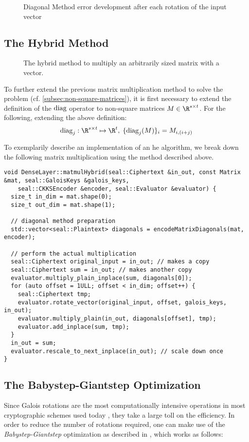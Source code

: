 \begin{figure}[H]
  \centering
  \pgfplotsset{/pgfplots/group/.cd,vertical sep=2.0cm}
  \caption{Diagonal Method error development after each rotation of the input vector}
\end{figure}

\subsection{The Hybrid Method}
\begin{figure}[H]
  \centering
  \caption[Image adapted from \cite{2018-gazelle}]{The hybrid method to multiply an arbitrarily sized matrix with a vector.}
\end{figure}
To further extend the previous matrix multiplication method to solve the problem
(cf. \autoref{subsec:non-square-matrices}), it is first necessary to extend the definition of the $\mathrm{diag}$ operator to non-square matrices $M \in \R^{s \times t}$.
For the following, extending the above definition:
$$\diag_j: \R^{s \times t} \mapsto \R^t, \; \{\diag_j(M)\}_i = M_{i, (i+j)}$$

To exemplarily describe an implementation of an \gls{he} algorithm, we break down the following matrix multiplication using the method described above.
\begin{verbatim}
void DenseLayer::matmulHybrid(seal::Ciphertext &in_out, const Matrix &mat, seal::GaloisKeys &galois_keys,
    seal::CKKSEncoder &encoder, seal::Evaluator &evaluator) {
  size_t in_dim = mat.shape(0);
  size_t out_dim = mat.shape(1);

  // diagonal method preparation
  std::vector<seal::Plaintext> diagonals = encodeMatrixDiagonals(mat, encoder);

  // perform the actual multiplication
  seal::Ciphertext original_input = in_out; // makes a copy
  seal::Ciphertext sum = in_out; // makes another copy
  evaluator.multiply_plain_inplace(sum, diagonals[0]);
  for (auto offset = 1ULL; offset < in_dim; offset++) {
    seal::Ciphertext tmp;
    evaluator.rotate_vector(original_input, offset, galois_keys, in_out);
    evaluator.multiply_plain(in_out, diagonals[offset], tmp);
    evaluator.add_inplace(sum, tmp);
  }
  in_out = sum;
  evaluator.rescale_to_next_inplace(in_out); // scale down once
}
\end{verbatim}

\subsection{The Babystep-Giantstep Optimization}
Since Galois rotations are the most computationally intensive operations in most cryptographic schemes used today \parencite{2021-pasta}, they take a large toll on the efficiency.
In order to reduce the number of rotations required, one can make use of the \textit{Babystep-Giantstep} optimization as described in \cite{2018-faster-helib}, which works as follows:

